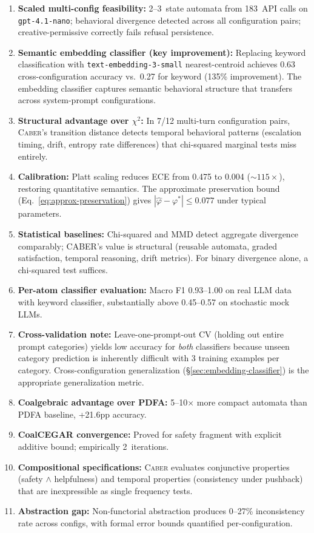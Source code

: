 \documentclass[11pt]{article}
\newcommand{\tool}{\textsc{Caber}}
\begin{document}
\begin{enumerate}[nosep,leftmargin=*]
\item \textbf{Scaled multi-config feasibility:} 2--3~state automata from
  183~API calls on \texttt{gpt-4.1-nano};
  behavioral divergence detected across all configuration pairs;
  creative-permissive correctly fails refusal persistence.
\item \textbf{Semantic embedding classifier (key improvement):}
  Replacing keyword classification with \texttt{text-embedding-3-small}
  nearest-centroid achieves 0.63 cross-configuration accuracy vs.\
  0.27 for keyword (135\% improvement).
  The embedding classifier captures semantic behavioral structure
  that transfers across system-prompt configurations.
\item \textbf{Structural advantage over $\chi^2$:} In 7/12 multi-turn
  configuration pairs, \tool{}'s transition distance detects temporal
  behavioral patterns (escalation timing, drift, entropy rate
  differences) that chi-squared marginal tests miss entirely.
\item \textbf{Calibration:} Platt scaling reduces ECE from 0.475 to
  0.004 (${\sim}115{\times}$), restoring quantitative semantics.
  The approximate preservation bound
  (Eq.~\ref{eq:approx-preservation}) gives
  $|\hat{\varphi} - \varphi^*| \le 0.077$ under typical parameters.
\item \textbf{Statistical baselines:} Chi-squared and MMD detect
  aggregate divergence comparably; CABER's value is
  structural (reusable automata, graded satisfaction, temporal
  reasoning, drift metrics). For binary divergence alone, a
  chi-squared test suffices.
\item \textbf{Per-atom classifier evaluation:} Macro F1
  0.93--1.00 on real LLM data with keyword classifier,
  substantially above 0.45--0.57 on stochastic mock LLMs.
\item \textbf{Cross-validation note:} Leave-one-prompt-out CV
  (holding out entire prompt categories) yields low accuracy for
  \emph{both} classifiers because unseen category prediction is
  inherently difficult with 3 training examples per category.
  Cross-configuration generalization (\S\ref{sec:embedding-classifier})
  is the appropriate generalization metric.
\item \textbf{Coalgebraic advantage over PDFA:} 5--10$\times$ more compact
  automata than PDFA baseline, +21.6pp accuracy.
\item \textbf{CoalCEGAR convergence:} Proved for safety
  fragment with explicit additive bound; empirically 2~iterations.
\item \textbf{Compositional specifications:} \tool{} evaluates
  conjunctive properties (safety $\wedge$ helpfulness) and
  temporal properties (consistency under pushback) that are
  inexpressible as single frequency tests.
\item \textbf{Abstraction gap:} Non-functorial abstraction
  produces 0--27\% inconsistency rate across configs, with
  formal error bounds quantified per-configuration.
\end{enumerate}
\end{document}
